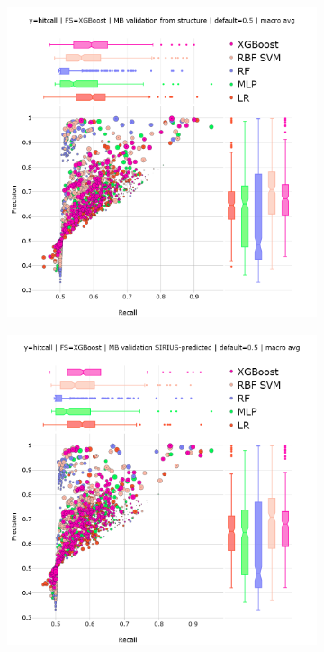 \begin{figure}
  \centering
  \begin{subfigure}[b]{0.495\textwidth}
      \centering
      \includegraphics[width=\textwidth]{generated_results/hitcall_classification_Feature_Selection_XGBClassifier_mb_val_structure_default_macro_avg.png}
      \caption{}
  \label{fig:hitcall_classification_Feature_Selection_XGBClassifier_mb_val_structure_default_macro_avg}
  \end{subfigure}
  \hfill
  \begin{subfigure}[b]{0.495\textwidth}
      \centering
      \includegraphics[width=\textwidth]{generated_results/hitcall_classification_Feature_Selection_XGBClassifier_mb_val_sirius_default_macro_avg.png}

\end{subfigure}
\end{figure}
